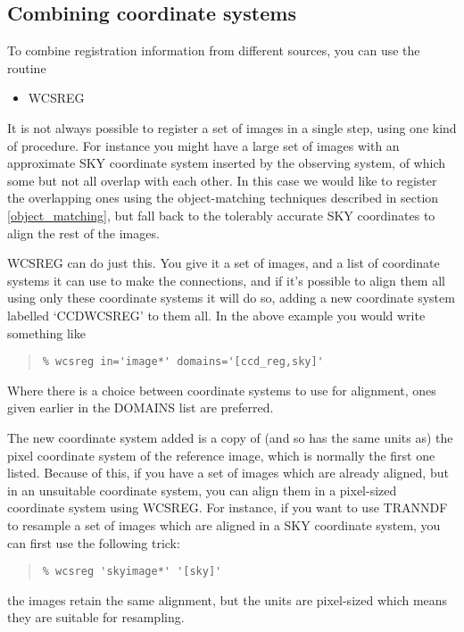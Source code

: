 \documentclass[twoside,11pt]{article}
\newcommand{\htmlref}[2]{#1}
\newcommand{\xlabel}[1]{}
\renewcommand{\_}{\texttt{\symbol{95}}}
\newenvironment{myquote}{\begin{quote}\begin{small}}{\end{small}\end{quote}}
\newcommand{\routine}[1]{{\sc #1}}
\newcommand{\xroutine}[1]{\htmlref{{\sc #1}}{#1}}
\begin{document}
\subsection{\xlabel{wcscombine}\label{wcscombine}Combining coordinate systems}

To combine registration information from different sources, you can
use the routine
\begin{itemize}
\item \xroutine{WCSREG}
\end{itemize}

It is not always possible to register a set of images in a single
step, using one kind of procedure.  For instance you might have
a large set of images with an approximate SKY coordinate system
inserted by the observing system, 
of which some but not all overlap with each other.
In this case we would like to register the overlapping ones
using the object-matching
techniques described in section \ref{object_matching},
but fall back to
the tolerably accurate SKY coordinates to align the rest of the images. 

\routine{WCSREG} can do just this.
You give it a set of images, and a list of coordinate systems
it can use to make the connections,
and if it's possible to align them all using only these coordinate
systems it will do so,
adding a new coordinate system labelled `CCD\_WCSREG' to them all.
In the above example you would write something like
\begin{myquote}
\begin{verbatim}
% wcsreg in='image*' domains='[ccd_reg,sky]'
\end{verbatim}
\end{myquote}
Where there is a choice between coordinate systems to use for alignment,
ones given earlier in the DOMAINS list are preferred.

The new coordinate system added is a copy of (and so has the same
units as) the pixel coordinate system of the reference image,
which is normally the first one listed.
Because of this, if you have
a set of images which are already aligned, but in an 
unsuitable coordinate system, 
you can align them in a pixel-sized coordinate system using
\routine{WCSREG}. 
For instance, if you want to use \xroutine{TRANNDF} 
to resample a set of images
which are aligned in a SKY coordinate system, you can first use the
following trick:
\begin{myquote}
\begin{verbatim}
% wcsreg 'skyimage*' '[sky]'
\end{verbatim}
\end{myquote}
the images retain the same alignment, but the units are pixel-sized
which means they are suitable for resampling.
\end{document}
